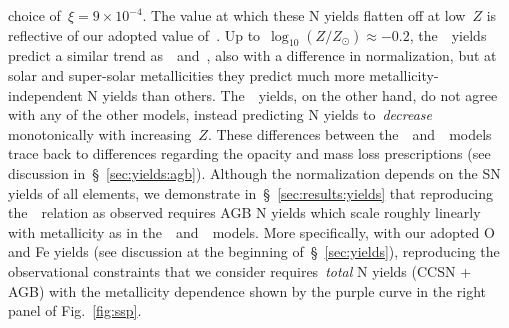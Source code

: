 \documentclass[ms.tex]{subfiles}
\begin{document}
choice of~$\xi = 9\times10^{-4}$.
The value at which these N yields flatten off at low~$Z$ is reflective of our
adopted value of~.
Up to~$\log_{10}(Z / Z_\odot) \approx -0.2$, the~\karakas~yields predict a
similar trend as~\cristallo~and~\ventura, also with a difference in
normalization, but at solar and super-solar metallicities they predict much
more metallicity-independent N yields than others.
The~\karakasten~yields, on the other hand, do not agree with any of the other
models, instead predicting N yields to~\textit{decrease} monotonically with
increasing~$Z$.
These differences between the~\karakasten~and~\karakas~models trace back to
differences regarding the opacity and mass loss prescriptions (see discussion
in~\S~\ref{sec:yields:agb}).
Although the normalization depends on the SN yields of all elements, we
demonstrate in~\S~\ref{sec:results:yields} that reproducing the~\ohno~relation
as observed requires AGB N yields which scale roughly linearly with metallicity
as in the~\cristallo~and~\ventura~models.
More specifically, with our adopted O and Fe yields (see discussion at the
beginning of~\S~\ref{sec:yields}), reproducing the observational constraints
that we consider requires~\textit{total} N yields (CCSN + AGB) with the
metallicity dependence shown by the purple curve in the right panel of
Fig.~\ref{fig:ssp}.
\end{document}
